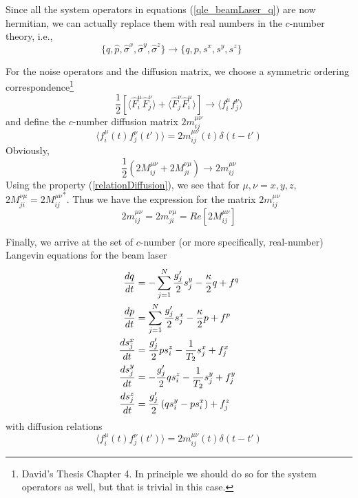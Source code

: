\documentclass{article}
\begin{document}
Since all the system operators in equations (\ref{qle_beamLaser_q}) are now hermitian, we can actually replace them with real numbers in the $c$-number theory, i.e., 
\begin{equation}
    \{ \hat{q}, \hat{p}, \hat{\sigma}^x, \hat{\sigma}^y, \hat{\sigma}^z\} \longrightarrow \{q, p, s^x, s^y, s^z\}\ \ \ \ \ \ \ 
\end{equation}


For the noise operators and the diffusion matrix, we choose a symmetric ordering correspondence\footnote{David's Thesis Chapter 4. In principle we should do so for the system operators as well, but that is trivial in this case.}
\begin{equation}
    \frac{1}{2}\left[ \langle \hat{F}_i^\mu\hat{F}_j^\nu\rangle+\langle\hat{F}_j^\nu\hat{F}_i^\mu\rangle\right]\longrightarrow\langle  f_i^\mu f_j^\nu \rangle
\end{equation}
and define the $c$-number diffusion matrix $2m_{ij}^{\mu \nu}$
\begin{equation}
\label{def:diffusion;cNumber}
    \langle f_i^\mu(t)f_j^\nu(t')\rangle = 2m_{ij}^{\mu \nu}(t)\delta(t-t')
\end{equation}
Obviously,
\begin{equation}
    \frac{1}{2}\left(2M_{ij}^{\mu \nu}+2M_{ji}^{\nu \mu}\right) \longrightarrow 2m_{ij}^{\mu \nu}
\end{equation}
Using the property (\ref{relationDiffusion}), we see that for $\mu, \nu=x,y,z$, $2M_{ji}^{\nu \mu}={2M_{ij}^{\mu \nu}}^\ast$. Thus we have the expression for the matrix $2m_{ij}^{\mu \nu}$
\begin{equation}
    2m_{ij}^{\mu \nu} = 2m_{ji}^{\nu \mu} = Re\left[2M_{ij}^{\mu \nu}\right]
\end{equation}

Finally, we arrive at the set of $c$-number (or more specifically, real-number) Langevin equations for the beam laser
\begin{align}
    \label{cNumber_qle_beamLaser_q}
    \notag \frac{dq}{dt} &= -\sum_{j=1}^N\frac{g'_j}{2}s_j^y-\frac{\kappa}{2}q+f^q\\
    \notag \frac{dp}{dt} &= \sum_{j=1}^N\frac{g'_j}{2}s_j^x-\frac{\kappa}{2}p+f^p\\
    \frac{d s_j^x}{dt} &= \frac{g'_j}{2}ps^z_i-\frac{1}{T_2}s_j^x+f_j^x\\
    \notag \frac{d s_j^y}{dt} &= -\frac{g'_j}{2}qs^z_i-\frac{1}{T_2}s_j^y+f_j^y\\
    \notag \frac{d s_j^z}{dt} &= \frac{g'_j}{2}\left(qs^y_i-ps_i^x\right)+f_j^z
\end{align}
with diffusion relations  
\begin{equation}
    \langle f_i^\mu(t)f_j^\nu(t')\rangle = 2m_{ij}^{\mu \nu}(t)\delta(t-t')
\end{equation}
\end{document}
